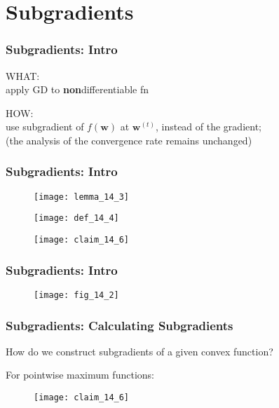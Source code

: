 \section{Subgradients}

\begin{frame}
\frametitle{Subgradients: Intro}

WHAT:\\
apply GD to \textbf{non}differentiable fn
\vspace{5mm}

HOW:\\
use subgradient of $f(\mathbf{w})$ at $\mathbf{w}^{(t)}$, instead of the gradient;\\
(the analysis of the convergence rate remains unchanged)

\end{frame}

\begin{frame}
\frametitle{Subgradients: Intro}

\begin{figure}
    \centering
    \texttt{[image: lemma\_14\_3]}
\end{figure}

\begin{figure}
    \centering
    \texttt{[image: def\_14\_4]}
\end{figure}

\begin{figure}
    \centering
    \texttt{[image: claim\_14\_6]}
\end{figure}

\end{frame}

\begin{frame}
\frametitle{Subgradients: Intro}

\begin{figure}
    \centering
    \texttt{[image: fig\_14\_2]}
\end{figure}

\end{frame}

\begin{frame}
\frametitle{Subgradients: Calculating Subgradients}

How do we construct subgradients of a given convex function?
\vspace{5mm}

For pointwise maximum functions:
\begin{figure}
    \centering
    \texttt{[image: claim\_14\_6]}
\end{figure}

\end{frame}
